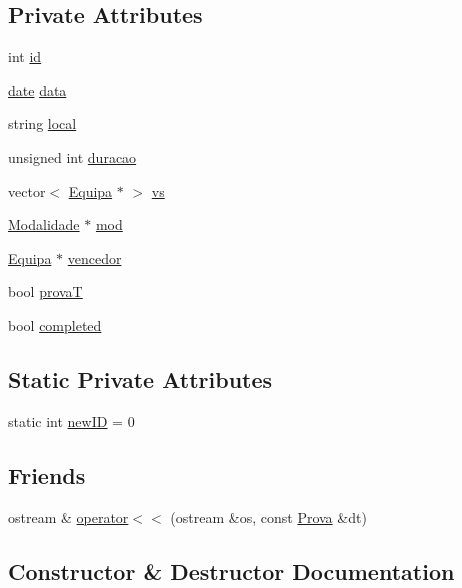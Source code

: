 \subsection*{Private Attributes}
\begin{DoxyCompactItemize}
\item 
int \hyperlink{class_prova_a23b51edf66d26661629b5330db67c3e7}{id}
\item 
\hyperlink{structdate}{date} \hyperlink{class_prova_a534b71e749122e706bbdd68e6b3410f4}{data}
\item 
string \hyperlink{class_prova_a4ff729b96dc2198a40d05dc7fdc38081}{local}
\item 
unsigned int \hyperlink{class_prova_a858c1f2a4be696df02eebe6419c34dc5}{duracao}
\item 
vector$<$ \hyperlink{class_equipa}{Equipa} $\ast$ $>$ \hyperlink{class_prova_aa085e9c4905e762142b6b735f4dfda30}{vs}
\item 
\hyperlink{class_modalidade}{Modalidade} $\ast$ \hyperlink{class_prova_a9a372fdc63a673192aca93e5b3cdba22}{mod}
\item 
\hyperlink{class_equipa}{Equipa} $\ast$ \hyperlink{class_prova_a9da09789da7cc0ef43b38197c96558fc}{vencedor}
\item 
bool \hyperlink{class_prova_a9b551ecafa591456d49345ceb9ea790d}{prova\+T}
\item 
bool \hyperlink{class_prova_aad473b9a0e23d11ba133ebdeea317522}{completed}
\end{DoxyCompactItemize}
\subsection*{Static Private Attributes}
\begin{DoxyCompactItemize}
\item 
static int \hyperlink{class_prova_aeaa338e40106c1be53f3f1134d3fb942}{new\+I\+D} = 0
\end{DoxyCompactItemize}
\subsection*{Friends}
\begin{DoxyCompactItemize}
\item 
ostream \& \hyperlink{class_prova_aec4ea869d7d5fddfd54f20dc74b80fe3}{operator$<$$<$} (ostream \&os, const \hyperlink{class_prova}{Prova} \&dt)
\end{DoxyCompactItemize}


\subsection{Constructor \& Destructor Documentation}
\hypertarget{class_prova_a4f36eaf2032327c06f7f7accd1ff7359}{}
